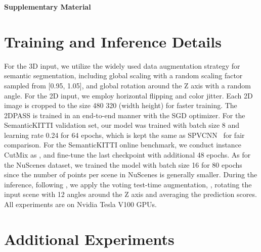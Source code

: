 \documentclass[runningheads]{llncs}
\begin{document}
	
	
	
	\newpage
	
	\setcounter{section}{0}
	\setcounter{figure}{0}
	\setcounter{table}{0}
	\renewcommand\thesection{\Alph{section}}
	
	{\Large\centering \textbf{Supplementary Material}} 
	
	


	
	\section{Training and Inference Details}
	\label{implementation}
For the 3D input, we utilize the widely used data augmentation strategy for semantic segmentation, including global scaling with a random scaling factor sampled from [0.95, 1.05], and global rotation around the Z axis with a random angle.
For the 2D input, we employ horizontal flipping and color jitter. Each 2D image is cropped to the size 480  320 (width  height) for faster training.
The 2DPASS is trained in an end-to-end manner with the SGD optimizer. 
For the SemanticKITTI validation set, our model was trained with batch size 8 and learning rate 0.24 for 64 epochs, which is kept the same as SPVCNN~\cite{tang2020searching} for fair comparison. 
For the SemanticKITTI online benchmark, we conduct instance CutMix as \cite{xu2021rpvnet}, and fine-tune the last checkpoint with additional 48 epochs.
As for the NuScenes dataset, we trained the model with batch size 16 for 80 epochs since the number of points per scene in NuScenes is generally smaller.
During the inference, following \cite{tang2020searching,zhou2020cylinder3d}, we apply the voting test-time augmentation, \ie, rotating the input scene with 12 angles around the Z axis and averaging the prediction scores.
All experiments are on Nvidia Tesla V100 GPUs.
	
	
	
	\label{exp}
	

	\section{Additional Experiments}
\end{document}
